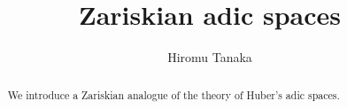 \documentclass[12pt,twoside]{amsart}
\title[Zariskian adic spaces]
{Zariskian adic spaces}
\author{Hiromu Tanaka}
\theoremstyle{definition}
\begin{document}
\maketitle


\begin{abstract}
We introduce a Zariskian analogue of the theory of Huber's adic spaces. 
\end{abstract}



\tableofcontents









\end{document}
